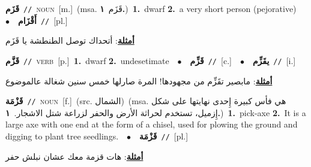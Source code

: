 \documentclass[10pt,a4paper,twoside]{article} %
\begin{document}
\begin{multicols}{2}
{\setlength\topsep{0pt}\textbf{\foreignlanguage{arabic}{قَزَم}}\ {\color{gray}\texttt{//}\color{black}}\ \textsc{noun}\ [m.]\ \color{gray}(msa. \foreignlanguage{arabic}{قَزَم}~\foreignlanguage{arabic}{\textbf{١.}})\color{black}\ \textbf{1.}~dwarf  \textbf{2.}~a very short person (pejorative)\ \ $\bullet$\ \ \setlength\topsep{0pt}\textbf{\foreignlanguage{arabic}{أَقْزَام}}\ {\color{gray}\texttt{//}\color{black}}\ [pl.]\  \begin{flushright}\color{gray}\foreignlanguage{arabic}{\textbf{\underline{\foreignlanguage{arabic}{أمثلة}}}: أتحداك توصل الطنطشة يا قَزَم}\end{flushright}\color{black}} \vspace{2mm}

{\setlength\topsep{0pt}\textbf{\foreignlanguage{arabic}{قَزَّم}}\ {\color{gray}\texttt{//}\color{black}}\ \textsc{verb}\ [p.]\ \textbf{1.}~dwarf  \textbf{2.}~undesetimate\ \ $\bullet$\ \ \setlength\topsep{0pt}\textbf{\foreignlanguage{arabic}{قَزِّم}}\ {\color{gray}\texttt{//}\color{black}}\ [c.]\ \ $\bullet$\ \ \setlength\topsep{0pt}\textbf{\foreignlanguage{arabic}{يقَزِّم}}\ {\color{gray}\texttt{//}\color{black}}\ [i.]\  \begin{flushright}\color{gray}\foreignlanguage{arabic}{\textbf{\underline{\foreignlanguage{arabic}{أمثلة}}}: مابصير تقَزِّم من مجهودها! المرة صارلها خمس سنين شغالة عالموضوع}\end{flushright}\color{black}} \vspace{2mm}

{\setlength\topsep{0pt}\textbf{\foreignlanguage{arabic}{قَزْمَة}}\ {\color{gray}\texttt{//}\color{black}}\ \textsc{noun}\ [f.]\ (src. \color{gray}\foreignlanguage{arabic}{الشمال}\color{black})\ \color{gray}(msa. \foreignlanguage{arabic}{هي فأس كبيرة إِحدى نهايتها على شكل إِزميل، تستخدم لحراثة الأرض والحفر لزراعة شتل الاشجار.}~\foreignlanguage{arabic}{\textbf{١.}})\color{black}\ \textbf{1.}~pick-axe  \textbf{2.}~It is a large axe with one end at the form of a chisel, used for plowing the ground and digging to plant tree seedlings.\ \ $\bullet$\ \ \setlength\topsep{0pt}\textbf{\foreignlanguage{arabic}{قَزْمَة}}\ {\color{gray}\texttt{//}\color{black}}\ [pl.]\  \begin{flushright}\color{gray}\foreignlanguage{arabic}{\textbf{\underline{\foreignlanguage{arabic}{أمثلة}}}: هات قزمة معك عشان نبلش حفر}\end{flushright}\color{black}} \vspace{2mm}


\end{multicols}
\end{document}
